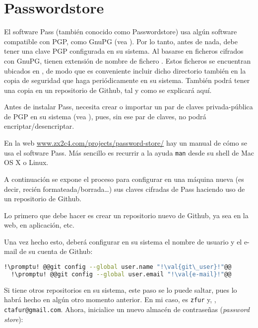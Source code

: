 \section{Passwordstore}\label{sec:passwordstore}
El software Pass (también conocido como Passwordstore) usa algún software compatible con PGP, como GnuPG (vea
). Por lo tanto, antes de nada, debe tener una clave PGP configurada en su sistema. Al
basarse en ficheros cifrados con GnuPG, tienen extensión de nombre de fichero . Estos ficheros se
encuentran ubicados en , de modo que es conveniente incluir dicho directorio también en
la copia de seguridad que haga periódicamente en su sistema. También podrá tener una copia en un repositorio de
Github, tal y como se explicará aquí.

\noindent Antes de instalar Pass, necesita crear o importar un par de claves privada-pública de PGP en su
sistema (vea ), pues, sin ese par de claves, no podrá encriptar/desencriptar.

En la web \url{www.zx2c4.com/projects/password-store/} hay un manual de cómo se usa el software Pass. Más
sencillo es recurrir a la ayuda \lstinline!man! desde su shell de Mac OS X o Linux.

A continuación se expone el proceso para configurar en una máquina nueva (es decir, recién
formateada/borrada\ldots ) sus claves cifradas de Pass haciendo uso de un repositorio de Github.

Lo primero que debe hacer es crear un repositorio nuevo de Github, ya sea en la web, en aplicación, etc.

Una vez hecho esto, deberá configurar en su sistema el nombre de usuario y el e-mail de su cuenta de Github:

\begin{lstlisting}[gobble=2,language=bash,style=bashinteract,escapechar=!]
  !\promptu! @@git config --global user.name "!\val{git\_user}!"@@
  !\promptu! @@git config --global user.email "!\val{e-mail}!"@@
\end{lstlisting}

\noindent Si tiene otros repositorios en su sistema, este paso se lo puede saltar, pues lo habrá hecho en algún
otro momento anterior. En mi caso,  es \lstinline!zfur! y, ,
\lstinline!ctafur@gmail.com!. Ahora, inicialice un nuevo almacén de contraseñas
(\foreignlanguage{english}{\textit{password store}}):

